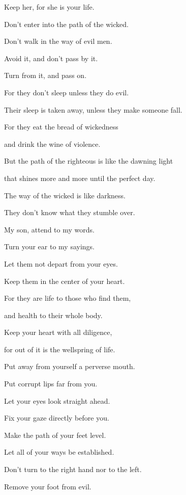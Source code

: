 {\par }{\QB Keep her, for she is your life.
\par }{\Q {}Don’t enter into the path of the wicked.
\par }{\QB Don’t walk in the way of evil men.
\par }{\Q {}Avoid it, and don’t pass by it.
\par }{\QB Turn from it, and pass on.
\par }{\Q {}For they don’t sleep unless they do evil.
\par }{\QB Their sleep is taken away, unless they make someone fall.
\par }{\Q {}For they eat the bread of wickedness
\par }{\QB and drink the wine of violence.
\par }{\Q {}But the path of the righteous is like the dawning light
\par }{\QB that shines more and more until the perfect day.
\par }{\Q {}The way of the wicked is like darkness.
\par }{\QB They don’t know what they stumble over.
\par }{\BB \par }{\Q {}My son, attend to my words.
\par }{\QB Turn your ear to my sayings.
\par }{\Q {}Let them not depart from your eyes.
\par }{\QB Keep them in the center of your heart.
\par }{\Q {}For they are life to those who find them,
\par }{\QB and health to their whole body.
\par }{\Q {}Keep your heart with all diligence,
\par }{\QB for out of it is the wellspring of life.
\par }{\Q {}Put away from yourself a perverse mouth.
\par }{\QB Put corrupt lips far from you.
\par }{\Q {}Let your eyes look straight ahead.
\par }{\QB Fix your gaze directly before you.
\par }{\Q {}Make the path of your feet level.
\par }{\QB Let all of your ways be established.
\par }{\Q {}Don’t turn to the right hand nor to the left.
\par }{\QB Remove your foot from evil.

}
